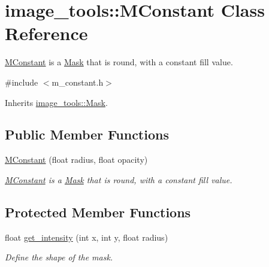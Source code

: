 \hypertarget{classimage__tools_1_1MConstant}{}\section{image\+\_\+tools\+:\+:M\+Constant Class Reference}
\label{classimage__tools_1_1MConstant}


\hyperlink{classimage__tools_1_1MConstant}{M\+Constant} is a \hyperlink{classimage__tools_1_1Mask}{Mask} that is round, with a constant fill value.  




{\ttfamily \#include $<$m\+\_\+constant.\+h$>$}



Inherits \hyperlink{classimage__tools_1_1Mask}{image\+\_\+tools\+::\+Mask}.

\subsection*{Public Member Functions}
\begin{DoxyCompactItemize}
\item 
\hyperlink{classimage__tools_1_1MConstant_aa7ed8862e2011c527ce7589b76267edb}{M\+Constant} (float radius, float opacity)\hypertarget{classimage__tools_1_1MConstant_aa7ed8862e2011c527ce7589b76267edb}{}\label{classimage__tools_1_1MConstant_aa7ed8862e2011c527ce7589b76267edb}

\begin{DoxyCompactList}\small\item\em \hyperlink{classimage__tools_1_1MConstant}{M\+Constant} is a \hyperlink{classimage__tools_1_1Mask}{Mask} that is round, with a constant fill value. \end{DoxyCompactList}\end{DoxyCompactItemize}
\subsection*{Protected Member Functions}
\begin{DoxyCompactItemize}
\item 
float \hyperlink{classimage__tools_1_1MConstant_a7d559b8473355bf08910b86e0da73de3}{get\+\_\+intensity} (int x, int y, float radius)
\begin{DoxyCompactList}\small\item\em Define the shape of the mask. \end{DoxyCompactList}\end{DoxyCompactItemize}


